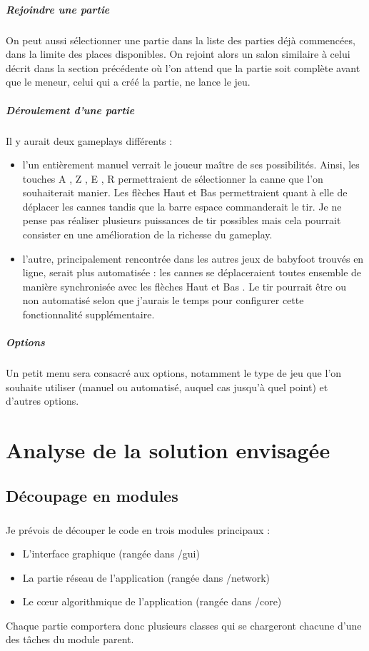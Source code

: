 \documentclass[a4paper,12pt]{report}
\begin{document}
\paragraph{Rejoindre une partie}
On peut aussi sélectionner une partie dans la liste des parties déjà commencées, dans la limite des places disponibles. On rejoint alors un salon similaire à celui décrit dans la section précédente où l'on attend que la partie soit complète avant que le meneur, celui qui a créé la partie, ne lance le jeu.
\paragraph{Déroulement d'une partie}
Il y aurait deux gameplays différents : 
\begin{itemize}
    \item l'un entièrement manuel verrait le joueur maître de ses possibilités. Ainsi, les touches \og A \fg, \og Z \fg, \og E \fg, \og R \fg permettraient de sélectionner la canne que l'on souhaiterait manier. Les flèches \og Haut \fg et \og Bas \fg permettraient quant à elle de déplacer les cannes tandis que la barre espace commanderait le tir. Je ne pense pas réaliser plusieurs puissances de tir possibles mais cela pourrait consister en une amélioration de la richesse du gameplay.
    \item l'autre, principalement rencontrée dans les autres jeux de babyfoot trouvés en ligne, serait plus automatisée : les cannes se déplaceraient toutes ensemble de manière synchronisée avec les flèches \og Haut \fg et \og Bas \fg. Le tir pourrait être ou non automatisé selon que j'aurais le temps pour configurer cette fonctionnalité supplémentaire.
\end{itemize}
\paragraph{Options}
Un petit menu sera consacré aux options, notamment le type de jeu que l'on souhaite utiliser (manuel ou automatisé, auquel cas jusqu'à quel point) et d'autres options.

\chapter{Analyse de la solution envisagée}
\section{Découpage en modules}
\paragraph{}
Je prévois de découper le code en trois modules principaux : 
\begin{itemize}
    \item L'interface graphique (rangée dans /gui)
    \item La partie réseau de l'application (rangée dans /network)
    \item Le c\oe{}ur algorithmique de l'application (rangée dans /core)
\end{itemize}
Chaque partie comportera donc plusieurs classes qui se chargeront chacune d'une des tâches du module parent.
\end{document}
